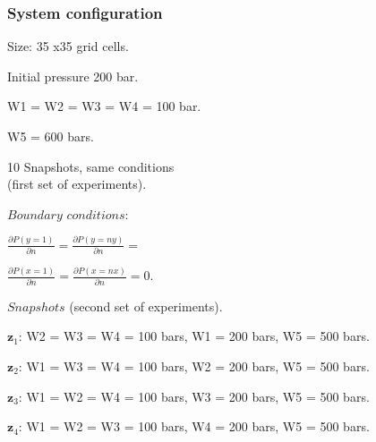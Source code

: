 \documentclass{beamer}
\begin{document}
\begin{frame}[shrink=10]
\frametitle{System configuration}
\begin{itemize}
\begin{minipage}{.6\textwidth}
\item[]
\item[] Size: 35 x35 grid cells.
\item[] Initial pressure 200 bar.
 \item[]  W1 =  W2 = W3 = W4 = 100 bar.
 \item[] W5 = 600 bars.
 \item[] 10 Snapshots, same conditions \\(first set of experiments).\\
 \end{minipage}%
\begin{minipage}{.4\textwidth}
\item[] $Boundary$ $conditions:$\\
\item[] $\frac{\partial P(y=1)}{\partial n}=\frac{\partial P(y=ny)}{\partial n}=$
\item[] $\frac{\partial P(x=1)}{\partial n}=\frac{\partial P(x=nx)}{\partial n}=0$.

\end{minipage}
\begin{minipage}{.8\textwidth}
\item[] $Snapshots$ (second set of experiments).
 \item[] $\mathbf{z}_1$:  W2 = W3 = W4 =  100 bars, 
 W1 = 200 bars, W5 = 500 bars.
\item[] $\mathbf{z}_2$: W1 = W3 = W4 = 100 bars,
 W2 = 200 bars, W5 = 500 bars.
\item[] $\mathbf{z}_3$: W1 = W2 = W4 = 100 bars,
 W3 = 200 bars, W5 =  500 bars.
\item[] $\mathbf{z}_4$:  W1 = W2 = W3 = 100 bars,
 W4 = 200 bars, W5 =  500 bars.\\
\end{minipage}%
\end{itemize}

\end{frame}
\end{document}
